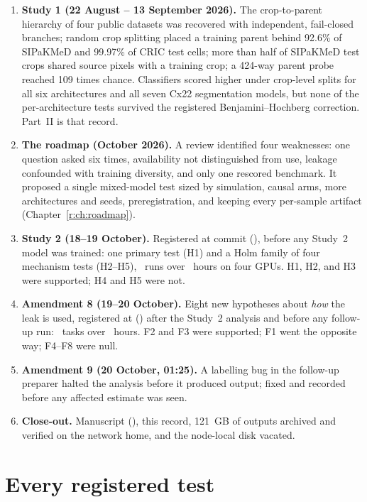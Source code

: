 \begin{enumerate}[leftmargin=1.8em]
\item \textbf{Study 1 (22 August -- 13 September 2026).} The crop-to-parent hierarchy of four public datasets was
recovered with independent, fail-closed branches; random crop splitting placed a training parent behind 92.6\% of
SIPaKMeD and 99.97\% of CRIC test cells; more than half of SIPaKMeD test crops shared source pixels with a training
crop; a 424-way parent probe reached 109 times chance. Classifiers scored higher under crop-level splits for all six
architectures and all seven Cx22 segmentation models, but none of the per-architecture tests survived the registered
Benjamini--Hochberg correction. Part~II is that record.
\item \textbf{The roadmap (October 2026).} A review identified four weaknesses: one question asked six times, availability
not distinguished from use, leakage confounded with training diversity, and only one rescored benchmark. It proposed a
single mixed-model test sized by simulation, causal arms, more architectures and seeds, preregistration, and keeping
every per-sample artifact (Chapter~\ref{r:ch:roadmap}).
\item \textbf{Study 2 (18--19 October).} Registered at commit \texttt{\RegistrationCommit} (\RegistrationTime), before any
Study~2 model was trained: one primary test (H1) and a Holm family of four mechanism tests (H2--H5), \RecStudyTwoRuns\
runs over \RecStudyTwoWall\ hours on four GPUs. H1, H2, and H3 were supported; H4 and H5 were not.
\item \textbf{Amendment 8 (19--20 October).} Eight new hypotheses about \emph{how} the leak is used, registered at
\texttt{\FollowupCommit} (\FollowupTime) after the Study~2 analysis and before any follow-up run: \RecFollowTasks\ tasks
over \RecFollowWall\ hours. F2 and F3 were supported; F1 went the opposite way; F4--F8 were null.
\item \textbf{Amendment 9 (20 October, 01:25).} A labelling bug in the follow-up preparer halted the analysis before it
produced output; fixed and recorded before any affected estimate was seen.
\item \textbf{Close-out.} Manuscript (\artifact{paper/v2}), this record, 121~GB of outputs archived and verified on the
network home, and the node-local disk vacated.
\end{enumerate}

\section{Every registered test}

